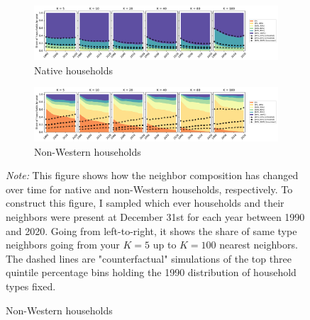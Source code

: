 \documentclass[main.tex]{subfiles}
\begin{document}
\begin{landscape}
\begin{figure}
    \centering
    \caption{Same type neighbor by $K$-nearest proximity (1990-2020)}
    \label{fig:temporal_development_knn}
    \begin{subfigure}{1.5\textwidth}
    \includegraphics[width=\linewidth]{figs/temporal_knn_native_1990_2020_w_sim.pdf}
    \caption{Native households}
    \label{fig:temporal_knn_native_1990_2020}
    \end{subfigure}	
    \begin{subfigure}{1.5\textwidth}
    \includegraphics[width=\linewidth]{figs/temporal_knn_non_west_1990_2020_w_sim.pdf}
    \caption{Non-Western households}
    \label{fig:temporal_knn_non_west_1990_2020}
    \end{subfigure}	
\begin{tablenotes}
\item \footnotesize \textit{Note:} This figure shows how the neighbor composition has changed over time for native and non-Western households, respectively. To construct this figure, I sampled which ever households and their neighbors were present at December 31st for each year between 1990 and 2020. Going from left-to-right, it shows the share of same type neighbors going from your $K=5$ up to $K=100$ nearest neighbors. The dashed lines are "counterfactual" simulations of the top three quintile percentage bins holding the 1990 distribution of household types fixed.
\end{tablenotes}
\end{figure}
\end{landscape}
\end{document}
